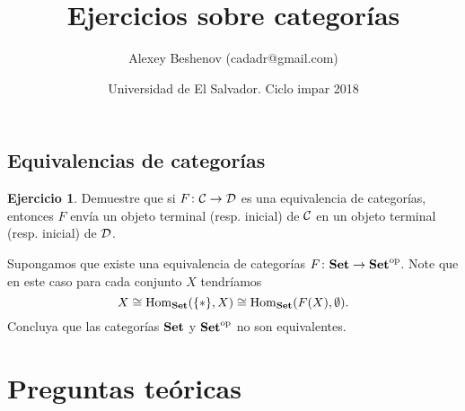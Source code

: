 \documentclass{article}
\author{Alexey Beshenov (cadadr@gmail.com)}
\title{Ejercicios sobre categorías}
\date{Universidad de El Salvador. Ciclo impar 2018}
\numberwithin{equation}{section}
\theoremstyle{definition}
\newtheorem{ejerc}{Ejercicio}
\begin{document}
{\normalfont\sffamily\bfseries \maketitle}



\subsection*{Equivalencias de categorías}

\begin{ejerc}
Demuestre que si $F\colon \mathcal{C}\to \mathcal{D}$ es una equivalencia de categorías, entonces $F$ envía un objeto terminal (resp. inicial) de $\mathcal{C}$ en un objeto terminal (resp. inicial) de $\mathcal{D}$.

Supongamos que existe una equivalencia de categorías $F\colon \text{\bf Set}\to \text{\bf Set}^\mathrm{op}$. Note que en este caso para cada conjunto $X$ tendríamos
$$X \cong \operatorname{Hom}_{\text{\bf Set}} (\{ \ast \},X) \cong \operatorname{Hom}_{\text{\bf Set}} (F (X), \emptyset).$$
Concluya que las categorías $\text{\bf Set}$ y $\text{\bf Set}^\mathrm{op}$ no son equivalentes.
\end{ejerc}

\iffalse
\pagebreak

\section*{Preguntas teóricas}
\end{document}
